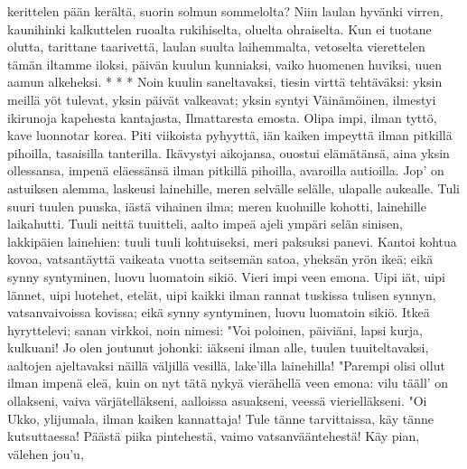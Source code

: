     kerittelen pään kerältä,
    suorin solmun sommelolta?
  \endverse
  \beginverse
    Niin laulan hyvänki virren,
    kaunihinki kalkuttelen
    ruoalta rukihiselta,
    oluelta ohraiselta.
    Kun ei tuotane olutta,
    tarittane taarivettä,
    laulan suulta laihemmalta,
    vetoselta vierettelen
    tämän iltamme iloksi,
    päivän kuulun kunniaksi,
    vaiko huomenen huviksi,
    uuen aamun alkeheksi.
    * * *
  \endverse
  \beginverse
    Noin kuulin saneltavaksi,
    tiesin virttä tehtäväksi:
    yksin meillä yöt tulevat,
    yksin päivät valkeavat;
    yksin syntyi Väinämöinen,
    ilmestyi ikirunoja
    kapehesta kantajasta,
    Ilmattaresta emosta.
  \endverse
  \beginverse
    Olipa impi, ilman tyttö,
    kave luonnotar korea.
    Piti viikoista pyhyyttä,
    iän kaiken impeyttä
    ilman pitkillä pihoilla,
    tasaisilla tanterilla.
    Ikävystyi aikojansa,
    ouostui elämätänsä,
    aina yksin ollessansa,
    impenä eläessänsä
  \endverse
  \beginverse
    ilman pitkillä pihoilla,
    avaroilla autioilla.
    Jop' on astuiksen alemma,
    laskeusi lainehille,
    meren selvälle selälle,
    ulapalle aukealle.
    Tuli suuri tuulen puuska,
    iästä vihainen ilma;
    meren kuohuille kohotti,
    lainehille laikahutti.
  \endverse
  \beginverse
    Tuuli neittä tuuitteli,
    aalto impeä ajeli
    ympäri selän sinisen,
    lakkipäien lainehien:
    tuuli tuuli kohtuiseksi,
    meri paksuksi panevi.
    Kantoi kohtua kovoa,
    vatsantäyttä vaikeata
    vuotta seitsemän satoa,
    yheksän yrön ikeä;
  \endverse
  \beginverse
    eikä synny syntyminen,
    luovu luomatoin sikiö.
    Vieri impi veen emona.
    Uipi iät, uipi lännet,
    uipi luotehet, etelät,
    uipi kaikki ilman rannat
    tuskissa tulisen synnyn,
    vatsanvaivoissa kovissa;
    eikä synny syntyminen,
    luovu luomatoin sikiö.
  \endverse
  \beginverse
    Itkeä hyryttelevi;
    sanan virkkoi, noin nimesi:
    "Voi poloinen, päiviäni,
    lapsi kurja, kulkuani!
    Jo olen joutunut johonki:
    iäkseni ilman alle,
    tuulen tuuiteltavaksi,
    aaltojen ajeltavaksi
    näillä väljillä vesillä,
    lake'illa lainehilla!
  \endverse
  \beginverse
    "Parempi olisi ollut
    ilman impenä eleä,
    kuin on nyt tätä nykyä
    vierähellä veen emona:
    vilu tääll' on ollakseni,
    vaiva värjätelläkseni,
    aalloissa asuakseni,
    veessä vierielläkseni.
    "Oi Ukko, ylijumala,
    ilman kaiken kannattaja!
  \endverse
  \beginverse
    Tule tänne tarvittaissa,
    käy tänne kutsuttaessa!
    Päästä piika pintehestä,
    vaimo vatsanvääntehestä!
    Käy pian, välehen jou'u,
